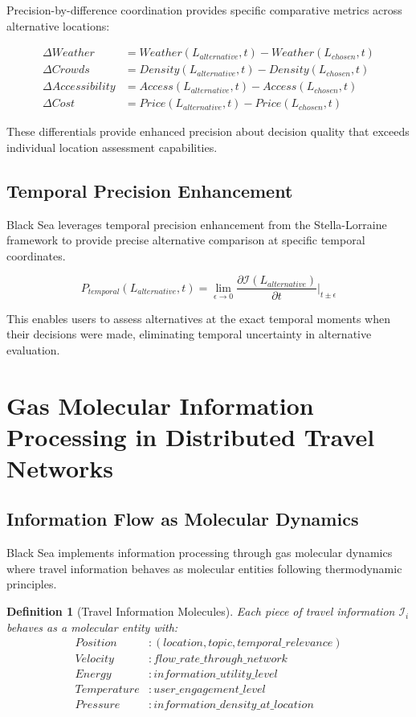 \documentclass[12pt,a4paper]{article}
\newtheorem{definition}{Definition}
\begin{document}
Precision-by-difference coordination provides specific comparative metrics across alternative locations:

\begin{align}
\Delta Weather &= Weather(L_{alternative}, t) - Weather(L_{chosen}, t) \\
\Delta Crowds &= Density(L_{alternative}, t) - Density(L_{chosen}, t) \\
\Delta Accessibility &= Access(L_{alternative}, t) - Access(L_{chosen}, t) \\
\Delta Cost &= Price(L_{alternative}, t) - Price(L_{chosen}, t)
\end{align}

These differentials provide enhanced precision about decision quality that exceeds individual location assessment capabilities.

\subsection{Temporal Precision Enhancement}

Black Sea leverages temporal precision enhancement from the Stella-Lorraine framework to provide precise alternative comparison at specific temporal coordinates.

\begin{equation}
P_{temporal}(L_{alternative}, t) = \lim_{\epsilon \rightarrow 0} \frac{\partial \mathcal{I}(L_{alternative})}{\partial t}\bigg|_{t \pm \epsilon}
\end{equation}

This enables users to assess alternatives at the exact temporal moments when their decisions were made, eliminating temporal uncertainty in alternative evaluation.

\section{Gas Molecular Information Processing in Distributed Travel Networks}

\subsection{Information Flow as Molecular Dynamics}

Black Sea implements information processing through gas molecular dynamics where travel information behaves as molecular entities following thermodynamic principles.

\begin{definition}[Travel Information Molecules]
Each piece of travel information $\mathcal{I}_i$ behaves as a molecular entity with:
\begin{align}
Position &: (location, topic, temporal\_relevance) \\
Velocity &: flow\_rate\_through\_network \\
Energy &: information\_utility\_level \\
Temperature &: user\_engagement\_level \\
Pressure &: information\_density\_at\_location
\end{align}
\end{definition}
\end{document}
